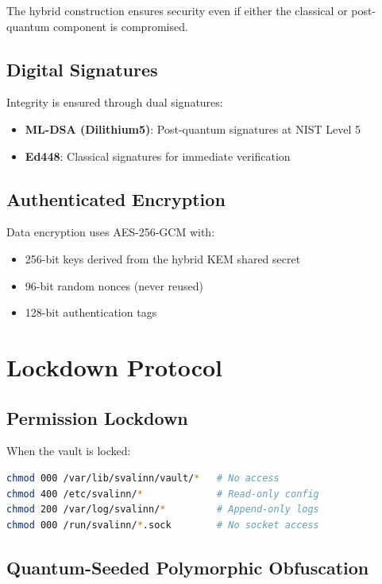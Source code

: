 \documentclass[11pt,a4paper]{article}
\begin{document}
The hybrid construction ensures security even if either the classical or post-quantum component is compromised.

\subsection{Digital Signatures}

Integrity is ensured through dual signatures:

\begin{itemize}
    \item \textbf{ML-DSA (Dilithium5)}: Post-quantum signatures at NIST Level 5
    \item \textbf{Ed448}: Classical signatures for immediate verification
\end{itemize}

\subsection{Authenticated Encryption}

Data encryption uses AES-256-GCM with:
\begin{itemize}
    \item 256-bit keys derived from the hybrid KEM shared secret
    \item 96-bit random nonces (never reused)
    \item 128-bit authentication tags
\end{itemize}

\section{Lockdown Protocol}

\subsection{Permission Lockdown}

When the vault is locked:

\begin{lstlisting}[language=bash]
chmod 000 /var/lib/svalinn/vault/*   # No access
chmod 400 /etc/svalinn/*             # Read-only config
chmod 200 /var/log/svalinn/*         # Append-only logs
chmod 000 /run/svalinn/*.sock        # No socket access
\end{lstlisting}

\subsection{Quantum-Seeded Polymorphic Obfuscation}
\end{document}
